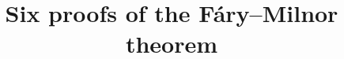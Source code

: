 \documentclass[twoside]{article}
\newcommand{\amm}[2]{#2} %
\begin{document}

\title{Six proofs of the F\'ary--Milnor theorem}
\amm{\author{Anton Petrunin and Stephan Stadler}}{}

\date{}
\maketitle








%
%





\sloppy
\printbibliography[heading=bibintoc]
\fussy
\end{document}
